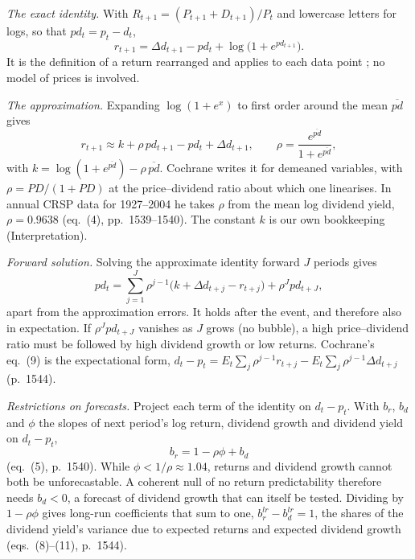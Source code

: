 \begin{qfresult}\label{res:campbell-shiller-identity}
 \emph{The exact identity.} With $R_{t+1}=(P_{t+1}+D_{t+1})/P_t$ and lowercase letters for logs, so that $pd_t=p_t-d_t$,
\[ r_{t+1}=\Delta d_{t+1}-pd_t+\log\bigl(1+e^{pd_{t+1}}\bigr). \]
It is the definition of a return rearranged and applies to each data point \citep[RFS 21(4), 2008, p.~1539 and n.~4]{wide-cochrane-dog}; no model of prices is involved.

\emph{The approximation.} Expanding $\log(1+e^{x})$ to first order around the mean $\overline{pd}$ gives
\[ r_{t+1}\approx k+\rho\,pd_{t+1}-pd_t+\Delta d_{t+1},\qquad \rho=\frac{e^{\overline{pd}}}{1+e^{\overline{pd}}}, \]
with $k=\log(1+e^{\overline{pd}})-\rho\,\overline{pd}$. Cochrane writes it for demeaned variables, with $\rho=PD/(1+PD)$ at the price--dividend ratio about which one linearises. In annual CRSP data for 1927--2004 he takes $\rho$ from the mean log dividend yield, $\rho=0.9638$ (eq.~(4), pp.~1539--1540). The constant $k$ is our own bookkeeping (Interpretation).

\emph{Forward solution.} Solving the approximate identity forward $J$ periods gives
\[ pd_t=\sum_{j=1}^{J}\rho^{j-1}\bigl(k+\Delta d_{t+j}-r_{t+j}\bigr)+\rho^{J}pd_{t+J}, \]
apart from the approximation errors. It holds after the event, and therefore also in expectation. If $\rho^{J}pd_{t+J}$ vanishes as $J$ grows (no bubble), a high price--dividend ratio must be followed by high dividend growth or low returns. Cochrane's eq.~(9) is the expectational form, $d_t-p_t=E_t\sum_j\rho^{j-1}r_{t+j}-E_t\sum_j\rho^{j-1}\Delta d_{t+j}$ (p.~1544).

\emph{Restrictions on forecasts.} Project each term of the identity on $d_t-p_t$. With $b_r$, $b_d$ and $\phi$ the slopes of next period's log return, dividend growth and dividend yield on $d_t-p_t$,
\[ b_r=1-\rho\phi+b_d \]
(eq.~(5), p.~1540). While $\phi<1/\rho\approx1.04$, returns and dividend growth cannot both be unforecastable. A coherent null of no return predictability therefore needs $b_d<0$, a forecast of dividend growth that can itself be tested. Dividing by $1-\rho\phi$ gives long-run coefficients that sum to one, $b_r^{lr}-b_d^{lr}=1$, the shares of the dividend yield's variance due to expected returns and expected dividend growth (eqs.~(8)--(11), p.~1544).


\end{qfresult}
